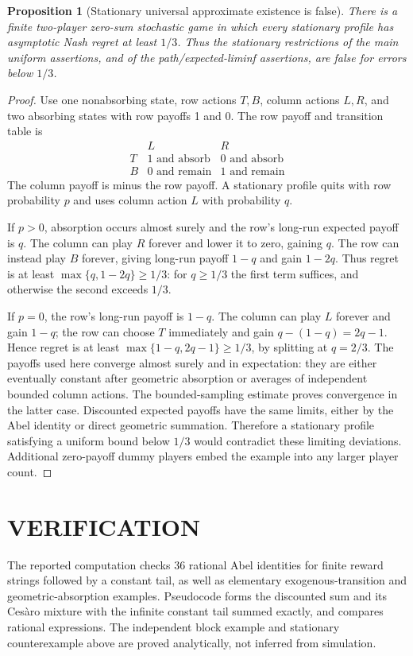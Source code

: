 \documentclass[11pt,a4paper]{article}
\newtheorem{proposition}[theorem]{Proposition}
\theoremstyle{definition}
\theoremstyle{remark}
\begin{document}
\begin{proposition}[Stationary universal approximate existence is false]
There is a finite two-player zero-sum stochastic game in which every stationary profile has asymptotic Nash regret at least $1/3$. Thus the stationary restrictions of the main uniform assertions, and of the path/expected-liminf assertions, are false for errors below $1/3$.
\end{proposition}
\begin{proof}
Use one nonabsorbing state, row actions $T,B$, column actions $L,R$, and two absorbing states with row payoffs 1 and 0. The row payoff and transition table is
\[
\begin{array}{c|cc}
 &L&R\\\hline
 T&1\text{ and absorb}&0\text{ and absorb}\\
 B&0\text{ and remain}&1\text{ and remain}
\end{array}
\]
The column payoff is minus the row payoff. A stationary profile quits with row probability $p$ and uses column action $L$ with probability $q$.

If $p>0$, absorption occurs almost surely and the row's long-run expected payoff is $q$. The column can play $R$ forever and lower it to zero, gaining $q$. The row can instead play $B$ forever, giving long-run payoff $1-q$ and gain $1-2q$. Thus regret is at least $\max\{q,1-2q\}\geq1/3$: for $q\geq1/3$ the first term suffices, and otherwise the second exceeds $1/3$.

If $p=0$, the row's long-run payoff is $1-q$. The column can play $L$ forever and gain $1-q$; the row can choose $T$ immediately and gain $q-(1-q)=2q-1$. Hence regret is at least $\max\{1-q,2q-1\}\geq1/3$, by splitting at $q=2/3$. The payoffs used here converge almost surely and in expectation: they are either eventually constant after geometric absorption or averages of independent bounded column actions. The bounded-sampling estimate proves convergence in the latter case. Discounted expected payoffs have the same limits, either by the Abel identity or direct geometric summation. Therefore a stationary profile satisfying a uniform bound below $1/3$ would contradict these limiting deviations. Additional zero-payoff dummy players embed the example into any larger player count.
\end{proof}

\section{VERIFICATION}
The reported computation checks 36 rational Abel identities for finite reward strings followed by a constant tail, as well as elementary exogenous-transition and geometric-absorption examples. Pseudocode forms the discounted sum and its Ces\`aro mixture with the infinite constant tail summed exactly, and compares rational expressions. The independent block example and stationary counterexample above are proved analytically, not inferred from simulation.
\end{document}

